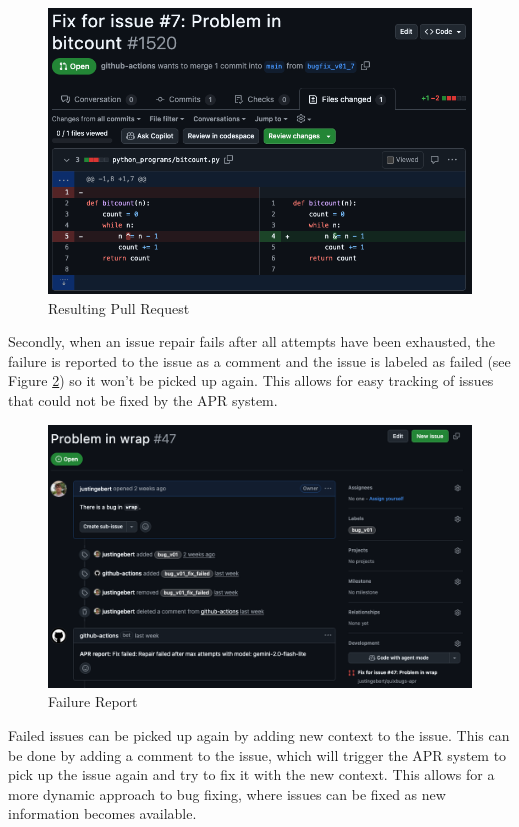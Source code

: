 \begin{figure}[H]
    \centering
    \includegraphics[width=1\textwidth]{images/workflow/pr.png}
    \caption{Resulting Pull Request}
    \label{fig:pr}
\end{figure}

Secondly, when an issue repair fails after all attempts have been exhausted, the failure is reported to the issue as a comment and the issue is labeled as failed (see Figure \ref{fig:failure-report}) so it won't be picked up again. This allows for easy tracking of issues that could not be fixed by the APR system.
\begin{figure}[H]
    \centering
    \includegraphics[width=1\textwidth]{images/workflow/failure_comment.png}
    \caption{Failure Report}
    \label{fig:failure-report}
\end{figure}

Failed issues can be picked up again by adding new context to the issue. This can be done by adding a comment to the issue, which will trigger the APR system to pick up the issue again and try to fix it with the new context. This allows for a more dynamic approach to bug fixing, where issues can be fixed as new information becomes available.


